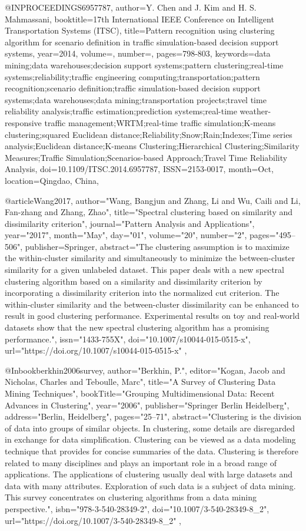 @INPROCEEDINGS{6957787, 
author={Y. {Chen} and J. {Kim} and H. S. {Mahmassani}}, 
booktitle={17th International IEEE Conference on Intelligent Transportation Systems (ITSC)}, 
title={Pattern recognition using clustering algorithm for scenario definition in traffic simulation-based decision support systems}, 
year={2014}, 
volume={}, 
number={}, 
pages={798-803}, 
keywords={data mining;data warehouses;decision support systems;pattern clustering;real-time systems;reliability;traffic engineering computing;transportation;pattern recognition;scenario definition;traffic simulation-based decision support systems;data warehouses;data mining;transportation projects;travel time reliability analysis;traffic estimation;prediction systems;real-time weather-responsive traffic management;WRTM;real-time traffic simulation;K-means clustering;squared Euclidean distance;Reliability;Snow;Rain;Indexes;Time series analysis;Euclidean distance;K-means Clustering;Hierarchical Clustering;Similarity Measures;Traffic Simulation;Scenarios-based Approach;Travel Time Reliability Analysis}, 
doi={10.1109/ITSC.2014.6957787}, 
ISSN={2153-0017}, 
month={Oct},
location={Qingdao, China}},

@article{Wang2017,
author="Wang, Bangjun
and Zhang, Li
and Wu, Caili
and Li, Fan-zhang
and Zhang, Zhao",
title="Spectral clustering based on similarity and dissimilarity criterion",
journal="Pattern Analysis and Applications",
year="2017",
month="May",
day="01",
volume="20",
number="2",
pages="495--506",
publisher={Springer},
abstract="The clustering assumption is to maximize the within-cluster similarity and simultaneously to minimize the between-cluster similarity for a given unlabeled dataset. This paper deals with a new spectral clustering algorithm based on a similarity and dissimilarity criterion by incorporating a dissimilarity criterion into the normalized cut criterion. The within-cluster similarity and the between-cluster dissimilarity can be enhanced to result in good clustering performance. Experimental results on toy and real-world datasets show that the new spectral clustering algorithm has a promising performance.",
issn="1433-755X",
doi="10.1007/s10044-015-0515-x",
url="https://doi.org/10.1007/s10044-015-0515-x"
},

@Inbook{berkhin2006survey,
author="Berkhin, P.",
editor="Kogan, Jacob
and Nicholas, Charles
and Teboulle, Marc",
title="A Survey of Clustering Data Mining Techniques",
bookTitle="Grouping Multidimensional Data: Recent Advances in Clustering",
year="2006",
publisher="Springer Berlin Heidelberg",
address="Berlin, Heidelberg",
pages="25--71",
abstract="Clustering is the division of data into groups of similar objects. In clustering, some details are disregarded in exchange for data simplification. Clustering can be viewed as a data modeling technique that provides for concise summaries of the data. Clustering is therefore related to many disciplines and plays an important role in a broad range of applications. The applications of clustering usually deal with large datasets and data with many attributes. Exploration of such data is a subject of data mining. This survey concentrates on clustering algorithms from a data mining perspective.",
isbn="978-3-540-28349-2",
doi="10.1007/3-540-28349-8_2",
url="https://doi.org/10.1007/3-540-28349-8_2"
},



